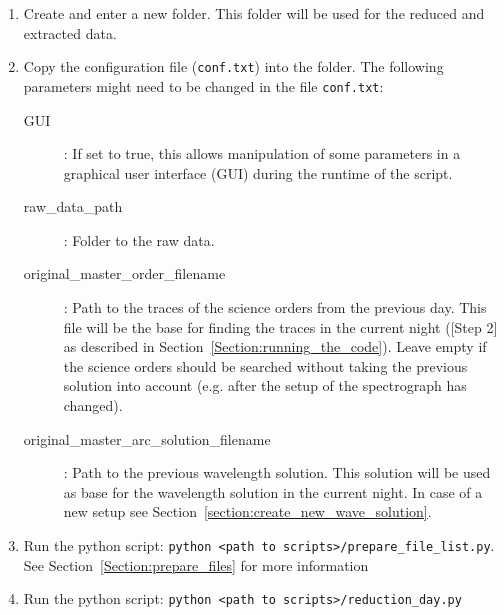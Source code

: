 \documentclass[10pt,a4paper]{article}
\begin{document}
\begin{enumerate}
  \item Create and enter a new folder. This folder will be used for the reduced and extracted data.
  \item Copy the configuration file (\verb|conf.txt|) into the folder. The following parameters might need to be changed in the file \verb|conf.txt|:
  \begin{description}
    \item[GUI] : If set to true, this allows manipulation of some parameters in a graphical user interface (GUI) during the runtime of the script.
    \item[raw\_data\_path] : Folder to the raw data.
    \item[original\_master\_order\_filename] : Path to the traces of the science orders from the previous day. This file will be the base for finding the traces in the current night ([Step 2] as described in Section~\ref{Section:running_the_code}). Leave empty if the science orders should be searched without taking the previous solution into account (e.g. after the setup of the spectrograph has changed).
    \item[original\_master\_arc\_solution\_filename] : Path to the previous wavelength solution. This solution will be used as base for the wavelength solution in the current night. In case of a new setup see Section~\ref{section:create_new_wave_solution}.
  \end{description}
  \item Run the python script: \verb|python <path to scripts>/prepare_file_list.py|. See Section~\ref{Section:prepare_files} for more information
  \item Run the python script: \verb|python <path to scripts>/reduction_day.py|
\end{enumerate}
\end{document}
